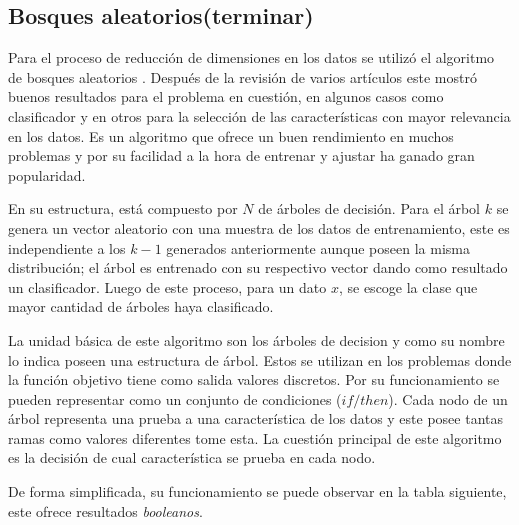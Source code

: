 \subsection{Bosques aleatorios(terminar)}
Para el proceso de reducción de dimensiones en los datos se utilizó el algoritmo de bosques aleatorios \cite{breiman2001random}. Después de la revisión de varios artículos \cite{almseidin2017evaluation,anani2018recurrent, abualkibash2019machine, hasan2016feature} este mostró buenos resultados para el problema en cuestión, en algunos casos como clasificador y en otros para la selección de las características con mayor relevancia en los datos. Es un algoritmo que ofrece un buen rendimiento en muchos problemas y por su facilidad a la hora de entrenar y ajustar ha ganado gran popularidad.

En su estructura, está compuesto por $N$ de árboles de decisión. Para el árbol $k$ se genera un vector aleatorio con una muestra de los datos de entrenamiento, este es independiente a los $k - 1$ generados anteriormente aunque poseen la misma distribución; el árbol es entrenado con su respectivo vector dando como resultado un clasificador. Luego de este proceso, para un dato $x$, se escoge la clase que mayor cantidad de árboles haya clasificado.

La unidad básica de este algoritmo son los árboles de decision y como su nombre lo indica poseen una estructura de árbol. Estos se utilizan en los problemas donde la función objetivo tiene como salida valores discretos. Por su funcionamiento se pueden representar como un conjunto de condiciones ($if/then$). Cada nodo de un árbol representa una prueba a una característica de los datos y este posee tantas ramas como valores diferentes tome esta. La cuestión principal de este algoritmo es la decisión de cual característica se prueba en cada nodo.

De forma simplificada, su funcionamiento se puede observar en la tabla siguiente, este ofrece resultados \textit{booleanos}.

